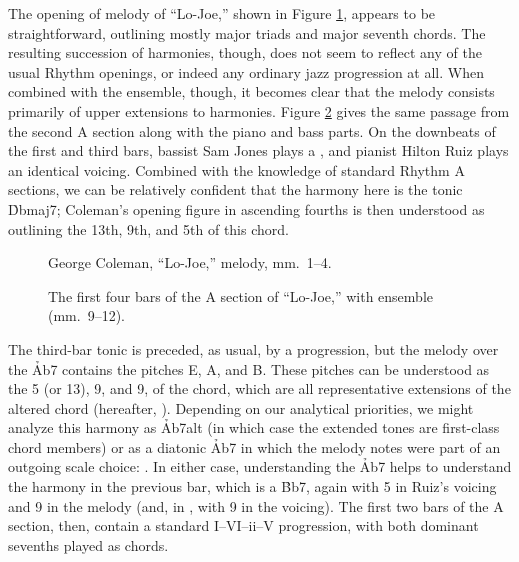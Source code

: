 The opening of melody of ``Lo-Joe,'' shown in Figure \ref{lj:opening-melody},
appears to be straightforward, outlining mostly major triads and major seventh
chords. The resulting succession of harmonies, though, does not seem to
reflect any of the usual Rhythm openings, or indeed any ordinary jazz
progression at all. When combined with the ensemble, though, it becomes clear
that the melody consists primarily of upper extensions to harmonies.
Figure \ref{lj:opening-ens} gives the same passage from the second A section
along with the piano and bass parts. On the downbeats of the first
and third bars, bassist Sam Jones plays a \Dflat, and pianist Hilton Ruiz
plays an identical voicing. Combined with the knowledge of standard Rhythm A
sections, we can be relatively confident that the harmony here is the tonic
\h{Dbmaj7}; Coleman's opening figure in ascending fourths is then understood
as outlining the 13th, 9th, and 5th of this chord.

\begin{figure}[tbp]
  \caption{George Coleman, ``Lo-Joe,'' melody, mm.~1--4.}
  \label{lj:opening-melody}
\end{figure}

\begin{figure}[tbp]
  \caption[The first four bars of the A section of ``Lo-Joe,'' with
  ensemble.]{%
    The first four bars of the A section of ``Lo-Joe,'' with ensemble
    (mm.~9--12).}
  \label{lj:opening-ens}
\end{figure}

The third-bar tonic is preceded, as usual, by a \tf progression, but the
melody over the \h{Ab7} contains the pitches E\nat, A\nat, and B\nat. These
pitches can be understood as the \sharp{}5 (or \flat{}13), \flat{}9, and
\sharp{}9, of the chord, which are all representative extensions of the
altered chord (hereafter, \alt). Depending on our analytical
priorities, we might analyze this harmony as \h{Ab7alt} (in which case the
extended tones are first-class chord members) or as a diatonic \h{Ab7} in
which the melody notes were part of an outgoing scale choice:
. In either case, understanding the
\h{Ab7} helps to understand the harmony in the previous bar, which is a
\h{Bb7}, again with \sharp{}5 in Ruiz's voicing and \flat{}9 in the melody
(and, in , with \sharp{}9 in the voicing). The first two bars of the
A section, then, contain a standard I--VI--ii--V progression, with both
dominant sevenths played as \alt chords.

